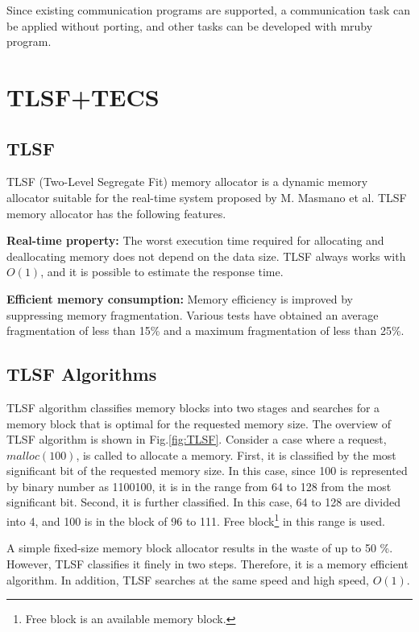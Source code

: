 \documentclass[a4j,12pt,oneside,openany,english]{jsbook}
\begin{document}
Since existing communication programs are supported, a communication task can be applied without porting, and other tasks can be developed with mruby program.


\section{TLSF+TECS}
\label{sec:TLSF+TECS}

\subsection{TLSF}

TLSF (Two-Level Segregate Fit) memory allocator\cite{par:TLSF}\cite{url:TLSF} is a dynamic memory allocator suitable for the real-time system proposed by M. Masmano et al.
TLSF memory allocator has the following features.

{\bf Real-time property:}
The worst execution time required for allocating and deallocating memory does not depend on the data size.
TLSF always works with $O(1)$, and it is possible to estimate the response time.

{\bf Efficient memory consumption:}
Memory efficiency is improved by suppressing memory fragmentation.
Various tests have obtained an average fragmentation of less than 15\% and a maximum fragmentation of less than 25\%.


\subsection{TLSF Algorithms}

TLSF algorithm classifies memory blocks into two stages and searches for a memory block that is optimal for the requested memory size.
The overview of TLSF algorithm is shown in Fig.\ref{fig:TLSF}.
Consider a case where a request, $malloc(100)$, is called to allocate a memory.
First, it is classified by the most significant bit of the requested memory size.
In this case, since 100 is represented by binary number as 1100100, it is in the range from 64 to 128 from the most significant bit.
Second, it is further classified.
In this case, 64 to 128 are divided into 4, and 100 is in the block of 96 to 111.
Free block\footnote{Free block is an available memory block.} in this range is used.

A simple fixed-size memory block allocator results in the waste of up to 50 \%.
However, TLSF classifies it finely in two steps.
Therefore, it is a memory efficient algorithm.
In addition, TLSF searches at the same speed and high speed, $O(1)$.
\end{document}
